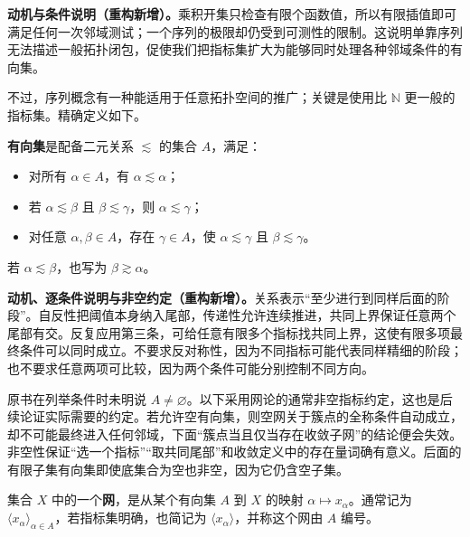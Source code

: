 \documentclass[../../main.tex]{subfiles}%
\begin{document}
\begin{remark}
\textbf{动机与条件说明（重构新增）。}乘积开集只检查有限个函数值，所以有限插值即可满足任何一次邻域测试；一个序列的极限却仍受到可测性的限制。这说明单靠序列无法描述一般拓扑闭包，促使我们把指标集扩大为能够同时处理各种邻域条件的有向集。
\end{remark}
不过，序列概念有一种能适用于任意拓扑空间的推广；关键是使用比 $\mathbb N$ 更一般的指标集。精确定义如下。
\begin{definition}[有向集]\label{definition:ch04-directed-set}
\textbf{有向集}是配备二元关系 $\lesssim$ 的集合 $A$，满足：
\begin{itemize}
\item 对所有 $\alpha\in A$，有 $\alpha\lesssim\alpha$；
\item 若 $\alpha\lesssim\beta$ 且 $\beta\lesssim\gamma$，则 $\alpha\lesssim\gamma$；
\item 对任意 $\alpha,\beta\in A$，存在 $\gamma\in A$，使 $\alpha\lesssim\gamma$ 且 $\beta\lesssim\gamma$。
\end{itemize}
若 $\alpha\lesssim\beta$，也写为 $\beta\gtrsim\alpha$。
\end{definition}
\begin{remark}
\textbf{动机、逐条件说明与非空约定（重构新增）。}关系表示“至少进行到同样后面的阶段”。自反性把阈值本身纳入尾部，传递性允许连续推进，共同上界保证任意两个尾部有交。反复应用第三条，可给任意有限多个指标找共同上界，这使有限多项最终条件可以同时成立。不要求反对称性，因为不同指标可能代表同样精细的阶段；也不要求任意两项可比较，因为两个条件可能分别控制不同方向。

原书在列举条件时未明说 $A\ne\varnothing$。以下采用网论的通常非空指标约定，这也是后续论证实际需要的约定。若允许空有向集，则空网关于簇点的全称条件自动成立，却不可能最终进入任何邻域，下面“簇点当且仅当存在收敛子网”的结论便会失效。非空性保证“选一个指标”“取共同尾部”和收敛定义中的存在量词确有意义。后面的有限子集有向集即使底集合为空也非空，因为它仍含空子集。
\end{remark}
\begin{definition}[网]\label{definition:ch04-net}
集合 $X$ 中的一个\textbf{网}，是从某个有向集 $A$ 到 $X$ 的映射 $\alpha\mapsto x_\alpha$。通常记为 $\langle x_\alpha\rangle_{\alpha\in A}$，若指标集明确，也简记为 $\langle x_\alpha\rangle$，并称这个网由 $A$ 编号。
\end{definition}
\end{document}
